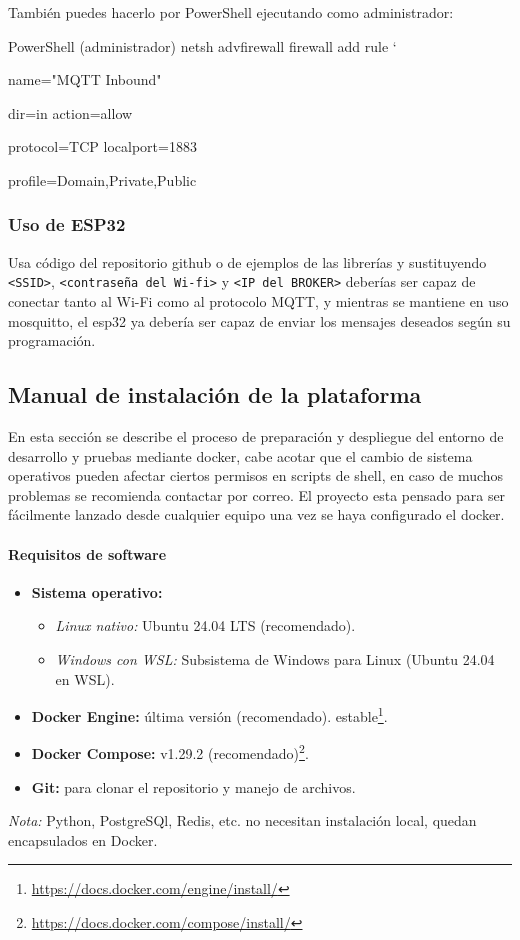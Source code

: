 \documentclass[12pt, a4paper]{article}
\begin{document}
\begin{umaappendices}
	
	También puedes hacerlo por PowerShell ejecutando como administrador:
	\begin{Terminal}{PowerShell (administrador)}
		netsh advfirewall firewall add rule `
		
		name="MQTT Inbound" 
		
		dir=in action=allow 
		
		protocol=TCP localport=1883
		
		profile=Domain,Private,Public
	\end{Terminal}
	
	\subsubsection{Uso de ESP32}
	Usa código del repositorio github o de ejemplos de las librerías y sustituyendo \texttt{<SSID>}, \texttt{<contraseña del Wi-fi>} y \texttt{<IP del BROKER>} deberías ser capaz de conectar tanto al Wi-Fi como al protocolo MQTT, y mientras se mantiene en uso mosquitto, el esp32 ya debería ser capaz de enviar los mensajes deseados según su programación.
	
	\newpage
	
	\subsection{Manual de instalación de la plataforma}
	\label{sec:deploy_docker}
	
	En esta sección se describe el proceso de preparación y despliegue del entorno de desarrollo y pruebas mediante docker, cabe acotar que el cambio de sistema operativos pueden afectar ciertos permisos en scripts de shell, en caso de muchos problemas se recomienda contactar por correo. El proyecto esta pensado para ser fácilmente lanzado desde cualquier equipo una vez se haya configurado el docker.
	
	\paragraph{Requisitos de software}
	\begin{itemize}
		\item \textbf{Sistema operativo:}
		\begin{itemize}
			\item \emph{Linux nativo:} Ubuntu 24.04 LTS (recomendado).  
			\item \emph{Windows con WSL:} Subsistema de Windows para Linux (Ubuntu 24.04 en WSL).  
		\end{itemize}
		\item \textbf{Docker Engine:} última versión (recomendado). estable\footnote{\url{https://docs.docker.com/engine/install/}}.  
		\item \textbf{Docker Compose:} v1.29.2 (recomendado)\footnote{\url{https://docs.docker.com/compose/install/}}.  
		\item \textbf{Git:} para clonar el repositorio y manejo de archivos.  
	\end{itemize}
	\emph{Nota:} Python, PostgreSQl, Redis, etc. no necesitan instalación local, quedan encapsulados en Docker.
	

\end{umaappendices}
\end{document}

